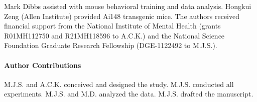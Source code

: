 Mark Dibbs assisted with mouse behavioral training and data analysis. Hongkui Zeng (Allen Institute) provided Ai148 transgenic mice. The authors received financial support from the National Institute of Mental Health (grants R01MH112750 and R21MH118596 to A.C.K.) and the National Science Foundation Graduate Research Fellowship (DGE-1122492 to M.J.S.).

\paragraph{Author Contributions} M.J.S. and A.C.K. conceived and designed the study. M.J.S. conducted all experiments. M.J.S. and M.D. analyzed the data. M.J.S. drafted the manuscript.

